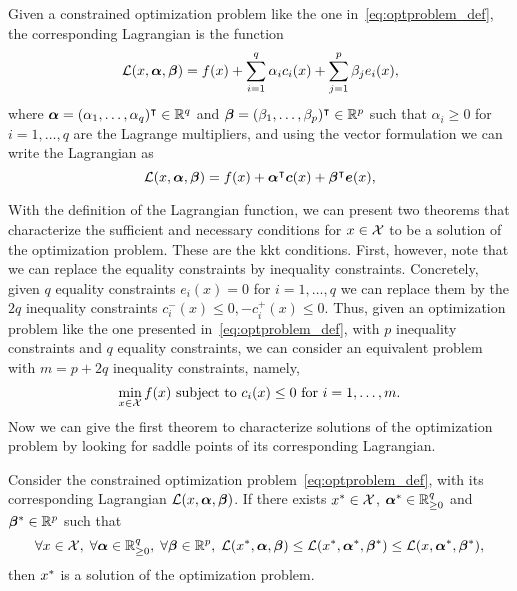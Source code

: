 \begin{definition}[Lagrangian]
    Given a constrained optimization problem like the one in~\eqref{eq:optproblem_def}, the corresponding Lagrangian is the function 
    \begin{equation}
        \label{eq:lagr_def}
        \lagr(x, \fv{\alpha}, \fv{\beta}) = f(x) + \sum_{i=1}^q \alpha_i c_i(x) + \sum_{j=1}^p \beta_j e_i(x) ,
    \end{equation}
    where $\bm{\alpha} = (\alpha_1, \ldots, \alpha_q)^\intercal \in \mathbb{R}^q$ and $\bm{\beta} = (\beta_1, \ldots, \beta_p)^\intercal \in \mathbb{R}^p$ such that $\alpha_i \geq 0$ for $i=1, \ldots, q$ are the Lagrange multipliers, and using the vector formulation we can write the Lagrangian as 
    \begin{equation}
        \label{eq:lagr_defvec}
        \lagr(x, \fv{\alpha}, \fv{\beta}) = f(x) + \fv{\alpha}^\intercal \fv{c}(x) + \fv{\beta}^\intercal \fv{e}(x) ,
    \end{equation}
\end{definition}
With the definition of the Lagrangian function, we can present two theorems that characterize the sufficient and necessary conditions for $x \in \mathcal{X}$ to be a solution of the optimization problem. These are the \acrfull{kkt} conditions.
%
First, however, note that we can replace the equality constraints by inequality constraints. Concretely, given $q$ equality constraints $e_i(x)=0$ for $i=1, \ldots, q$ we can replace them by the $2q$ inequality constraints 
$c_i^-(x) \leq 0, -c_i^+(x) \leq 0$.
%
Thus, given an optimization problem like the one presented in~\eqref{eq:optproblem_def}, with $p$ inequality constraints and $q$ equality constraints, we can consider an equivalent problem with $m = p + 2q$ inequality constraints, namely,
\begin{equation}
    \nonumber
    \min_{x \in \mathcal{X}} f(x) \text{ subject to } c_i(x) \leq 0 \text{ for } i=1, \ldots, m .
\end{equation}
%
Now we can give the first theorem to characterize solutions of the optimization problem by looking for saddle points of its corresponding Lagrangian.
\begin{theorem}\label{th:kkt_saddlepoint}
    Consider the constrained optimization problem~\eqref{eq:optproblem_def}, with its corresponding Lagrangian $\mathcal{L}(x, \bm{\alpha}, \bm{\beta})$. If there exists ${x}^* \in \mathcal{X}$, ${\bm{\alpha}}^* \in \mathbb{R}_{\geq 0}^q$ and ${\bm{\beta}}^* \in \mathbb{R}^p$ such that 
    \begin{equation}
        \label{eq:saddle_point}
        \forall x \in \vecspace,\;  \forall \fv{\alpha} \in \reals_{\geq 0}^q,\; \forall \fv{\beta} \in \reals^p,\; \lagr(\opt{x}, \fv{\alpha}, \fv{\beta}) \leq \lagr(\opt{x}, \opt{\fv{\alpha}}, \opt{\fv{\beta}}) \leq \lagr(x, \opt{\fv{\alpha}}, \opt{\fv{\beta}}),
    \end{equation}
    then ${x}^*$ is a solution of the optimization problem.
\end{theorem}
